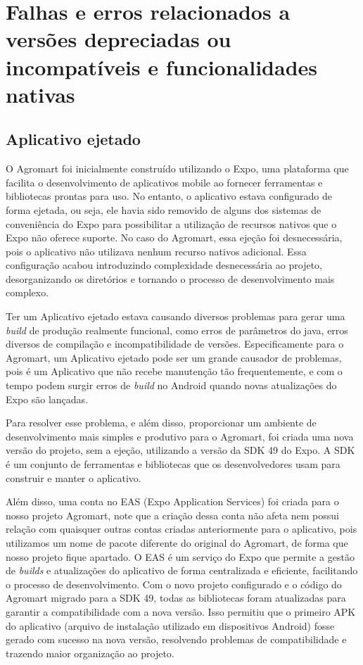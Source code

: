 \section{Falhas e erros relacionados a versões depreciadas ou incompatíveis e funcionalidades nativas}
\subsection{Aplicativo ejetado}

O Agromart foi inicialmente construído utilizando o Expo, uma plataforma que facilita o desenvolvimento de aplicativos mobile ao fornecer ferramentas e bibliotecas prontas para uso. No entanto, o aplicativo estava configurado de forma ejetada, ou seja, ele havia sido removido de alguns dos sistemas de conveniência do Expo para possibilitar a utilização de recursos nativos que o Expo não oferece suporte. No caso do Agromart, essa ejeção foi desnecessária, pois o aplicativo não utilizava nenhum recurso nativos adicional. Essa configuração acabou introduzindo complexidade desnecessária ao projeto, desorganizando os diretórios e tornando o processo de desenvolvimento mais complexo.

Ter um Aplicativo ejetado estava causando diversos problemas para gerar uma \textit{build} de produção realmente funcional, como erros de parâmetros do java, erros diversos de compilação e incompatibilidade de versões. Especificamente para o Agromart, um Aplicativo ejetado pode ser um grande causador de problemas, pois é um Aplicativo que não recebe manutenção tão frequentemente, e com o tempo podem surgir erros de \textit{build} no Android quando novas atualizações do Expo são lançadas.

Para resolver esse problema, e além disso, proporcionar um ambiente de desenvolvimento mais simples e produtivo para o Agromart, foi criada uma nova versão do projeto, sem a ejeção, utilizando a versão da SDK 49 do Expo. A SDK é um conjunto de ferramentas e bibliotecas que os desenvolvedores usam para construir e manter o aplicativo.

Além disso, uma conta no EAS (Expo Application Services) foi criada para o nosso projeto Agromart, note que a criação dessa conta não afeta nem possui relação com quaisquer outras contas criadas anteriormente para o aplicativo, pois utilizamos um nome de pacote diferente do original do Agromart, de forma que nosso projeto fique apartado. O EAS é um serviço do Expo que permite a gestão de \textit{builds} e atualizações do aplicativo de forma centralizada e eficiente, facilitando o processo de desenvolvimento. Com o novo projeto configurado e o código do Agromart migrado para a SDK 49, todas as bibliotecas foram atualizadas para garantir a compatibilidade com a nova versão. Isso permitiu que o primeiro APK do aplicativo (arquivo de instalação utilizado em dispositivos Android) fosse gerado com sucesso na nova versão, resolvendo problemas de compatibilidade e trazendo maior organização ao projeto.

